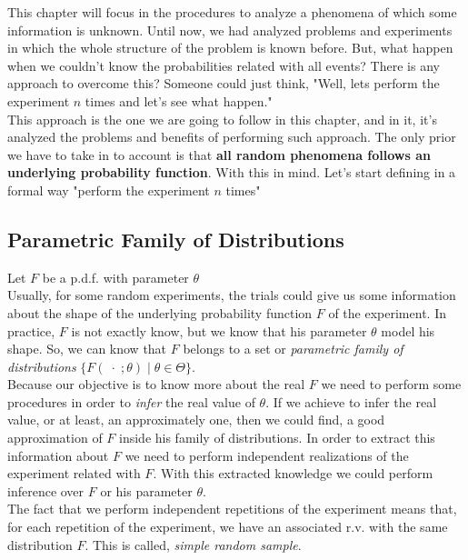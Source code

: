 This chapter will focus in the procedures to analyze a phenomena of which some
information is unknown. Until now, we had analyzed problems and experiments in
which the whole structure of the problem is known before. But, what happen when
we couldn't know the probabilities related with all events? There is any
approach to overcome this? Someone could just think, "Well, lets perform the
experiment $n$ times and let's see what happen."\\

This approach is the one we are going to follow in this chapter, and in it, it's
analyzed the problems and benefits of performing such approach. The only prior
we have to take in to account is that \textbf{all random phenomena follows an
underlying probability function}. With this in mind. Let's start defining in a
formal way "perform the experiment $n$ times"

\subsection{Parametric Family of Distributions}
Let $F$ be a p.d.f. with parameter $\theta$\\

Usually, for some random experiments, the trials could give us some information
about the shape of the underlying probability function $F$ of the experiment. In
practice, $F$ is not exactly know, but we know that his parameter $\theta$ model
his shape. So, we can know that $F$ belongs to a set or \textit{parametric
family of distributions} $\{F(\;\cdot\;;\theta)\; |\; \theta \in \Theta\}$.\\

Because our objective is to know more about the real $F$ we need to perform some
procedures in order to \textit{infer} the real value of $\theta$. If we achieve
to infer the real value, or at least, an approximately one, then we could find,
a good approximation of $F$ inside his family of distributions. In order to
extract this information about $F$ we need to perform independent realizations
of the experiment related with $F$. With this extracted knowledge we could
perform inference over $F$ or his parameter $\theta$.\\

The fact that we perform independent repetitions of the experiment means that,
for each repetition of the experiment, we have an associated r.v. with the same
distribution $F$. This is called, \textit{simple random sample}.

